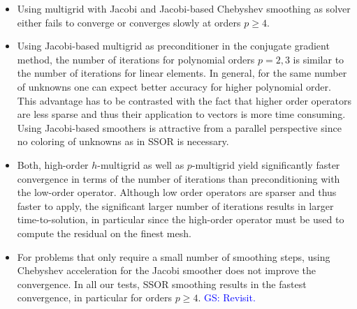 \documentclass[times]{nlaauth}
\newcommand{\gsnote}[1]{\textcolor{blue}{GS: #1}}
\begin{document}
\begin{itemize}
\item Using multigrid with Jacobi and Jacobi-based Chebyshev smoothing
  as solver either fails to converge or converges slowly at orders
  $p\ge 4$.
\item Using Jacobi-based multigrid as preconditioner in the conjugate
  gradient method, the number of iterations for polynomial orders
  $p=2,3$ is similar to the number of iterations for linear elements.
  In general, for the same number of unknowns one can expect better
  accuracy for higher polynomial order. This advantage has to be
  contrasted with the fact that higher order operators are less sparse
  and thus their application to vectors is more time consuming.  Using
  Jacobi-based smoothers is attractive from a parallel perspective
  since no coloring of unknowns as in SSOR is necessary.
\item Both, high-order $h$-multigrid as well as $p$-multigrid yield
  significantly faster convergence in terms of the number of
  iterations than preconditioning with the low-order
  operator. Although low order operators are sparser and thus faster
  to apply, the significant larger number of iterations results in
  larger time-to-solution, in particular since the high-order operator
  must be used to compute the residual on the finest mesh.
\item For problems that only require a small number of smoothing
  steps, using Chebyshev acceleration for the Jacobi smoother does not
  improve the convergence. In all our tests, SSOR smoothing results in
  the fastest convergence, in particular for orders $p\ge
  4$. \gsnote{Revisit.}
\end{itemize}




\end{document}
